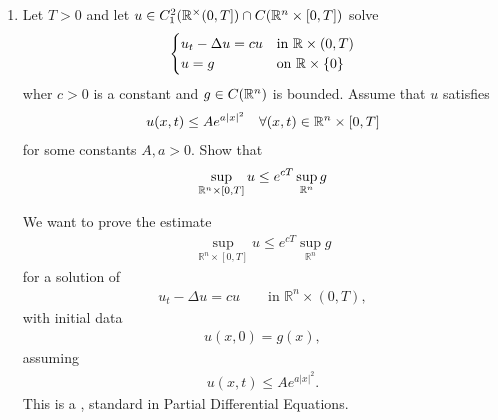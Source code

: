 \documentclass[12pt,a4paper]{report}
\begin{document}
\begin{enumerate}

If you'd like, I can explain the  for why the heat equation ``forgets" the shape of $g$ and only remembers the two end states $a$ and $b$.



\newpage
\item Let $T>0$ and let $u \in C_1^2(\mathbb{R}^\times(0,T])\cap C(\mathbb{R}^n\times[0,T])$ solve
\begin{align*}
	\begin{cases}
		 u_t-\Delta u=cu & \text{in } \mathbb{R}\times(0,T)\\
		u = g & \text{on } \mathbb{R}\times\{0\}
	\end{cases}
\end{align*}
wher $c >0$ is a constant and $g\in C(\mathbb{R}^n)$ is bounded.  Assume that $u$ satisfies
\begin{align*}
	u(x,t) \le Ae^{a|x|^2}\quad \forall(x,t)\in\mathbb{R}^n\times[0,T]
\end{align*}
for some constants $A,a >0$.  Show that
\begin{align*}
	\sup_{\mathbb{R}^n\times[0,T]} u\le e^{cT}\sup_{\mathbb{R}^n} g
\end{align*}

\HLINE

We want to prove the estimate
\begin{align*}
\sup_{\mathbb R^n\times[0,T]}u \le e^{cT}\sup_{\mathbb R^n}g
\end{align*}
for a solution of
\begin{align*}
u_t-\Delta u=cu \qquad\text{in }\mathbb R^n\times(0,T),
\end{align*}
with initial data
\begin{align*}
u(x,0)=g(x),
\end{align*}
assuming
\begin{align*}
u(x,t)\le Ae^{a|x|^2}.
\end{align*}
This is a , standard in Partial Differential Equations.


\end{enumerate}
\end{document}
